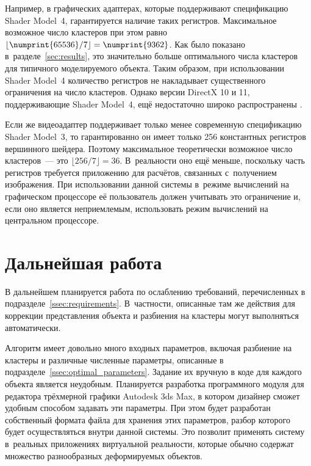 \documentclass[a4paper, 14pt, titlepage]{extarticle}
\newcommand{\eng}[1]{{\English #1}}
\let\oldsection\section
\renewcommand{\section}{\newpage\oldsection}
\newcommand{\num}[1]{\numprint{#1}}
\begin{document}
        Например, в графических адаптерах, которые поддерживают спецификацию \eng{Shader Model~4},
        гарантируется наличие \num{65536} таких регистров. Максимальное возможное число
        кластеров при этом равно $\lfloor \num{65536}/7 \rfloor = \num{9362}$. Как было показано
        в~разделе~\ref{sec:results}, это значительно больше оптимального числа кластеров для
        типичного моделируемого объекта. Таким образом, при использовании \eng{Shader Model~4}
        количество регистров не накладывает существенного ограничения на число кластеров. Однако
        версии DirectX 10 и 11, поддерживающие \eng{Shader Model~4}, ещё недостаточно широко
        распространены \cite{steam-hardware}.

        Если же видеоадаптер поддерживает только менее современную спецификацию \eng{Shader
        Model~3}, то гарантированно он имеет только 256 константных регистров вершинного шейдера.
        Поэтому максимальное теоретически возможное число кластеров~--- это $\lfloor 256/7 \rfloor = 36$.
        В~реальности оно ещё меньше, поскольку часть регистров требуется приложению для
        расчётов, связанных с~получением изображения. При использовании данной системы в~режиме
        вычислений на графическом процессоре её пользователь должен учитывать это ограничение и,
        если оно является неприемлемым, использовать режим вычислений на центральном процессоре.

  \section{Дальнейшая работа}

    В дальнейшем планируется работа по ослаблению требований, перечисленных
    в подразделе~\ref{ssec:requirements}. В~частности, описанные там же действия для коррекции
    представления объекта и разбиения на кластеры могут выполняться автоматически.

    Алгоритм имеет довольно много входных параметров, включая разбиение на кластеры и
    различные численные параметры, описанные в подразделе~\ref{ssec:optimal_parameters}. Задание их вручную в коде для каждого
    объекта является неудобным. Планируется разработка программного модуля для редактора
    трёхмерной графики Autodesk 3ds Max, в котором дизайнер сможет удобным способом задавать эти параметры. При этом
    будет разработан собственный формата файла для хранения этих параметров, разбор которого будет
    осуществляться внутри данной системы. Это позволит применять систему в~реальных приложениях
    виртуальной реальности, которые обычно содержат множество разнообразных деформируемых объектов.
\end{document}
